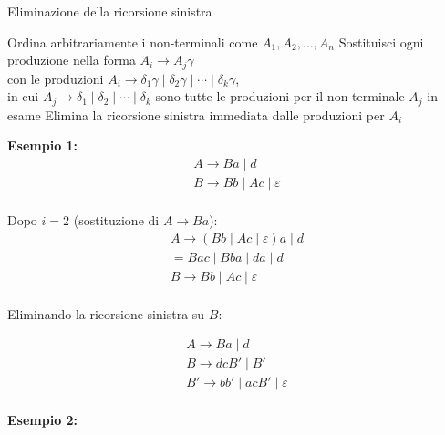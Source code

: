    \begin{algorithm}
        \caption{Eliminazione della ricorsione sinistra}
        \begin{algorithmic}[1]
        \State Ordina arbitrariamente i non-terminali come $A_1, A_2, \ldots, A_n$
                \State Sostituisci ogni produzione nella forma $A_i \rightarrow A_j \gamma$\\
                \hspace{1.5em}  con le produzioni $A_i \rightarrow \delta_1 \gamma \;|\; \delta_2 \gamma \;|\; \cdots \;|\; \delta_k \gamma$,\\
                \hspace{1.5em}  in cui $A_j \rightarrow \delta_1 \;|\; \delta_2 \;|\; \cdots \;|\; \delta_k$ sono tutte le produzioni per il non-terminale $A_j$ in esame
            \EndFor
            \State Elimina la ricorsione sinistra immediata dalle produzioni per $A_i$
        \EndFor
        \end{algorithmic}
    \end{algorithm}     

\textbf{Esempio 1:}
\[
\begin{array}{l}
A \rightarrow Ba \mid d \\
B \rightarrow Bb \mid Ac \mid \varepsilon \\
\end{array}
\]

\vspace{1em}
Dopo $i = 2$ (sostituzione di $A \rightarrow Ba$):
\[
\begin{array}{l}
A \rightarrow (Bb \mid Ac \mid \varepsilon) a \mid d \\[0.3em]
= Ba c \mid B b a \mid d a \mid d \\
B \rightarrow Bb \mid Ac \mid \varepsilon \\
\end{array}
\]

\vspace{1em}
Eliminando la ricorsione sinistra su $B$:

\[
\begin{array}{l}
A \rightarrow Ba \mid d \\
B \rightarrow dcB' \mid B' \\
B' \rightarrow bb' \mid acB' \mid \varepsilon \\
\end{array}
\]

\textbf{Esempio 2:}

